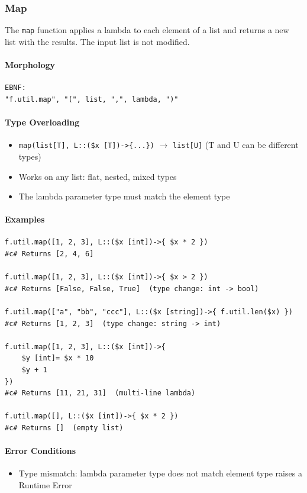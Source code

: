 \subsubsection{Map}
The \texttt{map} function applies a lambda to each element of a list and returns a new list with the results. The input list is not modified.

\paragraph{Morphology}
\begin{verbatim}
EBNF:
"f.util.map", "(", list, ",", lambda, ")"
\end{verbatim}

\paragraph{Type Overloading}
\begin{itemize}
\item \texttt{map(list[T], L::(\$x [T])->\{...\})} $\rightarrow$ \texttt{list[U]}
  (T and U can be different types)
\item Works on any list: flat, nested, mixed types
\item The lambda parameter type must match the element type
\end{itemize}

\paragraph{Examples}
\begin{verbatim}
f.util.map([1, 2, 3], L::($x [int])->{ $x * 2 })
#c# Returns [2, 4, 6]

f.util.map([1, 2, 3], L::($x [int])->{ $x > 2 })
#c# Returns [False, False, True]  (type change: int -> bool)

f.util.map(["a", "bb", "ccc"], L::($x [string])->{ f.util.len($x) })
#c# Returns [1, 2, 3]  (type change: string -> int)

f.util.map([1, 2, 3], L::($x [int])->{
    $y [int]= $x * 10
    $y + 1
})
#c# Returns [11, 21, 31]  (multi-line lambda)

f.util.map([], L::($x [int])->{ $x * 2 })
#c# Returns []  (empty list)
\end{verbatim}

\paragraph{Error Conditions}
\begin{itemize}
\item Type mismatch: lambda parameter type does not match element type raises a Runtime Error
\end{itemize}

